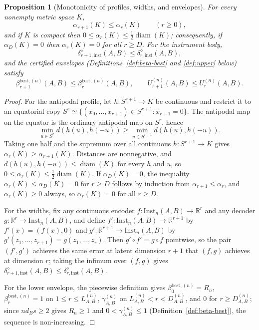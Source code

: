 \documentclass[11pt,a4paper]{article}
\newtheorem{proposition}[theorem]{Proposition}
\newcommand{\Inst}{\mathrm{Inst}}
\newcommand{\diam}{\operatorname{diam}}
\begin{document}
\begin{proposition}[Monotonicity of profiles, widths, and envelopes]
\label{prop:monotonicity}
For every nonempty metric space $K$,
\[
\alpha_{r+1}(K)\le\alpha_r(K)\qquad(r\ge0),
\]
and if $K$ is compact then $0\le\alpha_r(K)\le\tfrac12\diam(K)$; consequently, if $\alpha_D(K)=0$ then $\alpha_r(K)=0$ for all $r\ge D$. For the instrument body,
\[
\delta_{r+1,\mathrm{inst}}^{\diamond}(A,B)\le\delta_{r,\mathrm{inst}}^{\diamond}(A,B),
\]
and the certified envelopes (Definitions~\ref{def:beta-best} and \ref{def:upper} below) satisfy
\[
\beta_{r+1}^{\mathrm{best},(n)}(A,B)\le\beta_r^{\mathrm{best},(n)}(A,B),\qquad
U_{r+1}^{(n)}(A,B)\le U_r^{(n)}(A,B).
\]
\end{proposition}

\begin{proof}
For the antipodal profile, let $h:S^{r+1}\to K$ be continuous and restrict it to an equatorial copy $S^r\simeq\{(x_0,\dots,x_{r+1})\in S^{r+1}:x_{r+1}=0\}$. The antipodal map on the equator is the ordinary antipodal map on $S^r$, hence
\[
\min_{u\in S^r}d(h(u),h(-u))
\ge\min_{u\in S^{r+1}}d(h(u),h(-u)).
\]
Taking one half and the supremum over all continuous $h:S^{r+1}\to K$ gives $\alpha_r(K)\ge\alpha_{r+1}(K)$. Distances are nonnegative, and $d(h(u),h(-u))\le\diam(K)$ for every $h$ and $u$, so $0\le\alpha_r(K)\le\tfrac12\diam(K)$. If $\alpha_D(K)=0$, the inequality $\alpha_r(K)\le\alpha_D(K)=0$ for $r\ge D$ follows by induction from $\alpha_{r+1}\le\alpha_r$, and $\alpha_r(K)\ge0$ always, so $\alpha_r(K)=0$ for all $r\ge D$.

For the widths, fix any continuous encoder $f:\Inst_n(A,B)\to\mathbb R^r$ and any decoder $g:\mathbb R^r\to\Inst_n(A,B)$, and define $f':\Inst_n(A,B)\to\mathbb R^{r+1}$ by $f'(x)=(f(x),0)$ and $g':\mathbb R^{r+1}\to\Inst_n(A,B)$ by $g'(z_1,\dots,z_{r+1})=g(z_1,\dots,z_r)$. Then $g'\circ f'=g\circ f$ pointwise, so the pair $(f',g')$ achieves the same error at latent dimension $r+1$ that $(f,g)$ achieves at dimension $r$; taking the infimum over $(f,g)$ gives $\delta_{r+1,\mathrm{inst}}^{\diamond}(A,B)\le\delta_{r,\mathrm{inst}}^{\diamond}(A,B)$.

For the lower envelope, the piecewise definition gives $\beta_0^{\mathrm{best},(n)}=R_n$, $\beta_r^{\mathrm{best},(n)}=1$ on $1\le r\le L_{A,B}^{(n)}$, $\gamma_{A,B}^{(n)}$ on $L_{A,B}^{(n)}<r<D_{A,B}^{(n)}$, and $0$ for $r\ge D_{A,B}^{(n)}$; since $nd_Bs\ge2$ gives $R_n\ge1$ and $0<\gamma_{A,B}^{(n)}\le1$ (Definition~\ref{def:beta-best}), the sequence is non-increasing.


\end{proof}
\end{document}
